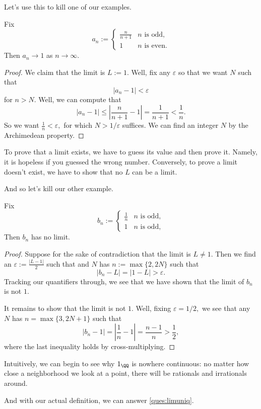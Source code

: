 \documentclass[../notes.tex]{subfiles}
\begin{document}
Let's use this to kill one of our examples.
\begin{exercise}
	Fix
	\[a_n:=\begin{cases}
		\frac n{n+1} & n\text{ is odd}, \\
		1 & n\text{ is even}.
	\end{cases}\]
	Then $a_n\to1$ as $n\to\infty.$
\end{exercise}
\begin{proof}
	We claim that the limit is $L:=1.$ Well, fix any $\varepsilon$ so that we want $N$ such that
	\[|a_n-1|<\varepsilon\]
	for $n>N.$ Well, we can compute that
	\[|a_n-1|\le\left|\frac n{n+1}-1\right|=\frac1{n+1}<\frac1n.\]
	So we want $\frac1n<\varepsilon,$ for which $N>1/\varepsilon$ suffices. We can find an integer $N$ by the Archimedean property.
\end{proof}
\begin{remark}
	To prove that a limit exists, we have to guess its value and then prove it. Namely, it is hopeless if you guessed the wrong number. Conversely, to prove a limit doesn't exist, we have to show that no $L$ can be a limit.
\end{remark}
And so let's kill our other example.
\begin{exercise}
	Fix
	\[b_n:=\begin{cases}
		\frac1n & n\text{ is odd}, \\
		1 & n\text{ is odd},
	\end{cases}\]
	Then $b_n$ has no limit.
\end{exercise}
\begin{proof}
	Suppose for the sake of contradiction that the limit is $L\ne1.$ Then we find an $\varepsilon:=\frac{|L-1|}2$ such that and $N$ has $n:=\max\{2,2N\}$ such that
	\[|b_n-L|=|1-L|>\varepsilon.\]
	Tracking our quantifiers through, we see that we have shown that the limit of $b_n$ is not $1.$

	It remains to show that the limit is not $1.$ Well, fixing $\varepsilon=1/2,$ we see that any $N$ has $n=\max\{3,2N+1\}$ such that
	\[|b_n-1|=\left|\frac1n-1\right|=\frac{n-1}n>\frac12,\]
	where the last inequality holds by cross-multiplying.
\end{proof}
\begin{remark}
	Intuitively, we can begin to see why $1_\QQ$ is nowhere continuous: no matter how close a neighborhood we look at a point, there will be rationals and irrationals around.
\end{remark}
And with our actual definition, we can answer \autoref{ques:limuniq}.
\end{document}
